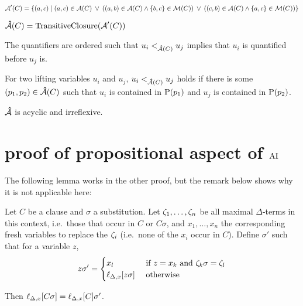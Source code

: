 \documentclass[,%
	paper=a4,%
	DIV14, %
	twoside=false,%
	liststotoc,
	bibtotoc,
	draft=false,%
	numbers=noendperiod
]{scrartcl}
\begin{document}
$\operatorname{\mathcal{A}}'(C) = \{ (a,c) \mid  (a,c) \in  \operatorname{\mathcal{A}}(C) \;\,{\lor}\;\, ((a,b) \in \operatorname{\mathcal{A}}(C) \land \{b, c\} \in \operatorname{\operatorname{\mathcal{M}}}(C) ) \;\,{\lor}\;\,  ((c, b) \in \operatorname{\mathcal{A}}(C) \land \{a, c\} \in \operatorname{\operatorname{\mathcal{M}}}(C)) \}$


$\operatorname{{\mathcal{\bm{\hat}A}}}(C) = \operatorname{TransitiveClosure}(\operatorname{\mathcal{A}}'(C))$

The quantifiers are ordered such that $u_i <_{\operatorname{{\mathcal{\bm{\hat}A}}}(C)} u_j$ implies that $u_i$ is quantified before $u_j$ is.


\begin{defi}
	For two lifting variables $u_i$ and $u_j$, $u_i <_{\operatorname{{\mathcal{\bm{\hat}A}}}(C)} u_j$ holds if there is some $(p_1, p_2) \in \operatorname{{\mathcal{\bm{\hat}A}}}(C)$ such that $u_i$ is contained in $\operatorname{{\operatorname P}}(p_1)$ and  $u_j$ is contained in $\operatorname{{\operatorname P}}(p_2)$.
\end{defi}

\begin{conj}
	$\operatorname{{\mathcal{\bm{\hat}A}}}$ is acyclic and irreflexive.
\end{conj}


\clearpage

\section{proof of propositional aspect of $\operatorname{AI}$}

The following lemma works in the other proof, but the remark below shows why it is not applicable here:

\begin{lemma} 
	\label{lemma:lift_subst_commute}
	Let $C$ be a clause and $\sigma$ a substitution.
	Let $\zeta_{1},\ldots,\zeta_{n}$ be all maximal $\Delta$-terms in this context, i.e.\ those that occur in $C$ or $C\sigma$,  and
	$x_1, \ldots, x_n$ the corresponding fresh variables to replace the $\zeta_{i}$ (i.e.~none of the $x_i$ occur in $C$).
	Define $\sigma'$ such that for a variable $z$,
	\[
		z \sigma' =
		\begin{cases} 
			x_l & \text{ if } z = x_k \text{ and } \zeta_{k}\sigma = \zeta_{l}  \\
			\ell_{\Delta,x}[z\sigma] & \text{ otherwise}
		\end{cases} 
	\]

	Then
	$\ell_{\Delta,x}[C\sigma] =
	\ell_{\Delta,x}[C]\sigma'$.
\end{lemma}
\end{document}
